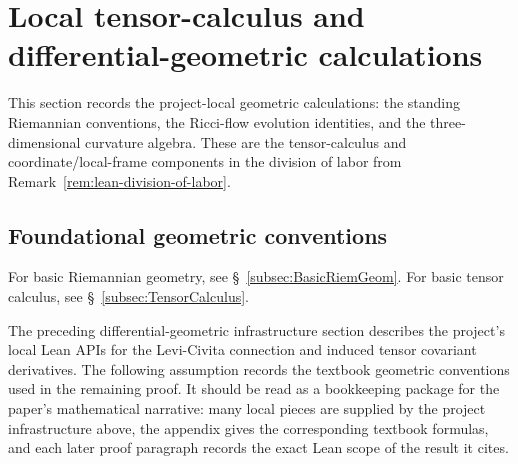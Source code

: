 \documentclass[11pt]{article}
\theoremstyle{plain}
\theoremstyle{definition}
\theoremstyle{remark}
\begin{document}
\section{Local tensor-calculus and differential-geometric calculations}
\label{sec:local-tensor-geometry}

This section records the project-local geometric calculations: the standing
Riemannian conventions, the Ricci-flow evolution identities, and the
three-dimensional curvature algebra.  These are the tensor-calculus and
coordinate/local-frame components in the division of labor from
Remark~\ref{rem:lean-division-of-labor}.

\subsection{Foundational geometric conventions}

For basic Riemannian geometry, see \S\ \ref{subsec:BasicRiemGeom}.  For basic
tensor calculus, see \S\ \ref{subsec:TensorCalculus}.

The preceding differential-geometric infrastructure section describes the
project's local Lean APIs for the Levi-Civita connection and induced tensor
covariant derivatives.  The following assumption records the textbook geometric
conventions used in the remaining proof.  It should be read as a bookkeeping
package for the paper's mathematical narrative: many local pieces are supplied
by the project infrastructure above, the appendix gives the corresponding
textbook formulas, and each later proof paragraph records the exact Lean scope
of the result it cites.
\end{document}
